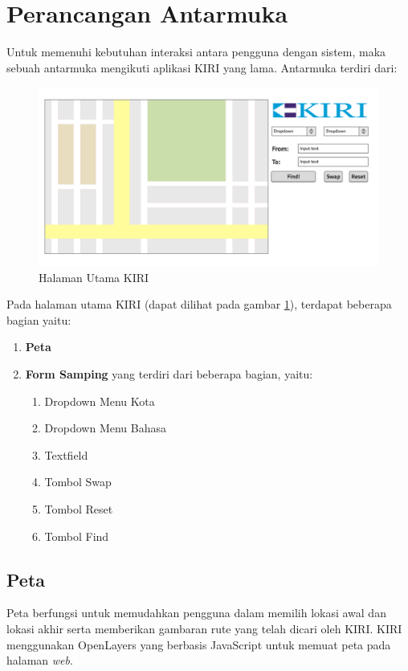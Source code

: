 \section{Perancangan Antarmuka}
\label{sec:perancangan_antarmuka}

Untuk memenuhi kebutuhan interaksi antara pengguna dengan sistem, maka sebuah antarmuka mengikuti aplikasi KIRI yang lama. Antarmuka terdiri dari:

\begin{figure}[H]
	\centering
	\includegraphics[scale=0.3]{Gambar/mockup-home}
	\caption{Halaman Utama KIRI} 
	\label{fig:4_KIRI_main}
\end{figure}

Pada halaman utama KIRI (dapat dilihat pada gambar \ref{fig:4_KIRI_main}), terdapat beberapa bagian yaitu:
    \begin{enumerate}
    		\item \textbf{Peta}
    		\item \textbf{Form Samping} yang terdiri dari beberapa bagian, yaitu:
    		\begin{enumerate}
    			\item Dropdown Menu Kota
    			\item Dropdown Menu Bahasa
    			\item Textfield
    			\item Tombol Swap
    			\item Tombol Reset
    			\item Tombol Find
    		\end{enumerate}
    \end{enumerate}

\subsection{Peta}
Peta berfungsi untuk memudahkan pengguna dalam memilih lokasi awal dan lokasi akhir serta memberikan gambaran rute yang telah dicari oleh KIRI. KIRI menggunakan OpenLayers yang berbasis JavaScript untuk memuat peta pada halaman \textit{web}. 

